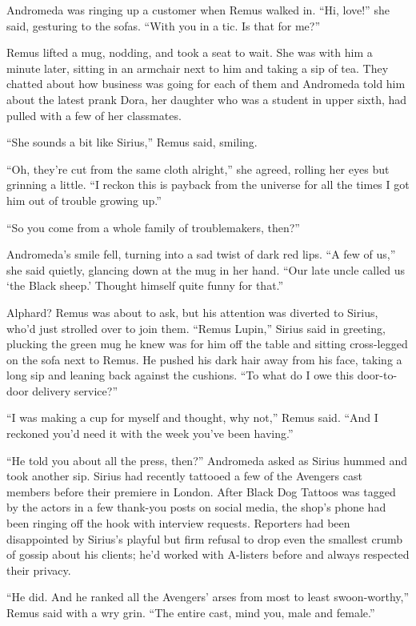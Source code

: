 Andromeda was ringing up a customer when Remus walked in. “Hi, love!” she said, gesturing to the sofas. “With you in a tic. Is that for me?”

Remus lifted a mug, nodding, and took a seat to wait. She was with him a minute later, sitting in an armchair next to him and taking a sip of tea. They chatted about how business was going for each of them and Andromeda told him about the latest prank Dora, her daughter who was a student in upper sixth, had pulled with a few of her classmates.

“She sounds a bit like Sirius,” Remus said, smiling.

“Oh, they’re cut from the same cloth alright,” she agreed, rolling her eyes but grinning a little. “I reckon this is payback from the universe for all the times I got him out of trouble growing up.”

“So you come from a whole family of troublemakers, then?”

Andromeda’s smile fell, turning into a sad twist of dark red lips. “A few of us,” she said quietly, glancing down at the mug in her hand. “Our late uncle called us ‘the Black sheep.’ Thought himself quite funny for that.”

Alphard? Remus was about to ask, but his attention was diverted to Sirius, who’d just strolled over to join them. “Remus Lupin,” Sirius said in greeting, plucking the green mug he knew was for him off the table and sitting cross-legged on the sofa next to Remus. He pushed his dark hair away from his face, taking a long sip and leaning back against the cushions. “To what do I owe this door-to-door delivery service?”

“I was making a cup for myself and thought, why not,” Remus said. “And I reckoned you’d need it with the week you’ve been having.”

“He told you about all the press, then?” Andromeda asked as Sirius hummed and took another sip. Sirius had recently tattooed a few of the Avengers cast members before their premiere in London. After Black Dog Tattoos was tagged by the actors in a few thank-you posts on social media, the shop’s phone had been ringing off the hook with interview requests. Reporters had been disappointed by Sirius’s playful but firm refusal to drop even the smallest crumb of gossip about his clients; he’d worked with A-listers before and always respected their privacy.

“He did. And he ranked all the Avengers’ arses from most to least swoon-worthy,” Remus said with a wry grin. “The entire cast, mind you, male and female.”

